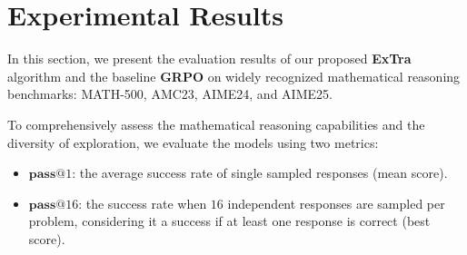 \section{Experimental Results}

In this section, we present the evaluation results of our proposed \textbf{ExTra} algorithm and the baseline \textbf{GRPO} on widely recognized mathematical reasoning benchmarks: MATH-500, AMC23, AIME24, and AIME25. 

To comprehensively assess the mathematical reasoning capabilities and the diversity of exploration, we evaluate the models using two metrics:
\begin{itemize}
    \item $\textbf{pass}@1$: the average success rate of single sampled responses (mean score).
    \item $\textbf{pass}@16$: the success rate when $16$ independent responses are sampled per problem, considering it a success if at least one response is correct (best score).
\end{itemize}

\begin{table}[htbp]
\centering
\caption{Performance Comparison on Mathematical Reasoning Benchmarks. We report the $\text{pass}@1$ (mean score) and $\text{pass}@16$ (best score) across MATH-500, AMC23, AIME24, and AIME25. The metrics reflect the capabilities of the models after 300 steps of RL fine-tuning.}
\label{tab:main_results}
\end{table}

